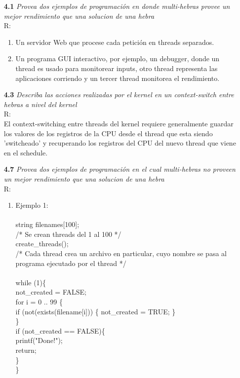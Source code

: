 \begin{itemize}
\item[\textbf{4.1}]\emph{ Provea dos ejemplos de programaci\'on en donde multi-hebras provee un mejor rendimiento que una solucion de una hebra}\\
R:
	\begin{enumerate}	
		\item Un servidor Web que procese cada petici\'on en threads separados.
		\item Un programa GUI interactivo, por ejemplo, un debugger, donde un thread es usado para monitorear inputs, otro thread representa las aplicaciones corriendo y un tercer thread monitorea el rendimiento.
	\end{enumerate}
\item[\textbf{4.3}]\emph{ Describa las acciones realizadas por el kernel en un context-switch entre hebras a nivel del kernel }\\
R:\\
El context-switching entre threads del kernel requiere generalmente guardar los valores de los registros de la CPU desde el thread que esta siendo 'switcheado' y recuperando los registros del CPU del nuevo thread que viene en el schedule.
\item[\textbf{4.7}]\emph{ Provea dos ejemplos de programaci\'on en el cual multi-hebras no proveen un mejor rendimiento que una solucion de una hebra}\\
R:
	\begin{enumerate}
		\item Ejemplo 1:\\\\
string filenames[100];\\
/* Se crean threads del 1 al 100 */\\
create\_threads();\\
/* Cada thread crea un archivo en particular, cuyo nombre se pasa al programa ejecutado por el thread */\\
\\while (1)\{ \\
not\_created = FALSE;\\
for i = 0 .. 99 \{ \\
if (not(exists(filename[i])) \{ not\_created = TRUE; \} \\
\} \\
if (not\_created == FALSE)\{ \\
printf("Done!");\\
return;\\
\} \\
\} \\ \\


\end{enumerate}
\end{itemize}
